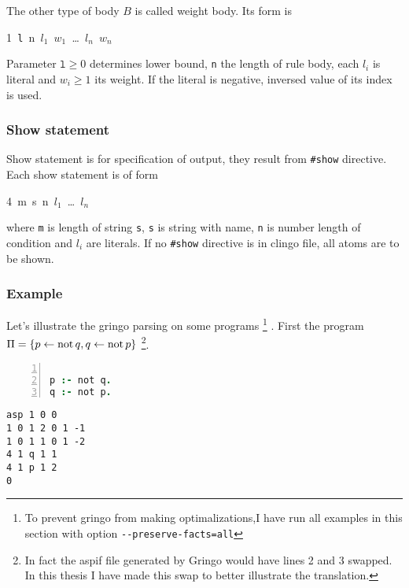 \documentclass{fithesis}
\begin{document}
The other type of body $B$ is called weight body. Its form is
{%
\newcommand{\ms}{\texttt{ }}
\begin{center}
    1\ms{}\texttt{l}\ms{}n\ms{}$l_1$\ms{}$w_1$\ms{}\dots\ms$l_n$\ms$w_n$
\end{center}
}\noindent
Parameter $\texttt{l}\geq 0$ determines lower bound, \texttt{n}
the length of rule body, each $l_i$ is literal and $w_i\geq 1$ its weight.
If the literal is negative, inversed value of its index is used.

\subsubsection{Show statement}

Show statement is for specification of output, they result from \texttt{\#show}
directive. Each show statement is of form
{%
\newcommand{\ms}{\texttt{ }}
\begin{center}
    4\ms{}m\ms{}s\ms{}n\ms{}$l_1$\ms{}\dots\ms$l_n$
\end{center}
}\noindent
where \texttt{m} is length of string \texttt{s}, \texttt{s} is string
with name, \texttt{n} is number length of condition and $l_i$ are literals.
If no \texttt{\#show} directive is in clingo file, all atoms are to be shown.

\subsubsection{Example}

Let's illustrate the gringo parsing on some programs%
\footnote{To prevent gringo from making optimalizations,I have run all examples
in this section with option \texttt{{-}{-}preserve-facts=all}}%
. First the program 
$\Pi = \{p \leftarrow{} \mathrm{not}\, q, q \leftarrow{} \mathrm{not}\, p\}$%
\footnote{In fact the aspif file generated by Gringo would have lines 2 and 3
swapped. In this thesis I have made this swap to better illustrate
the translation.}.

\begin{minipage}[t]{0.45\linewidth}
\centering
\begin{lstlisting}[language=prolog, numbers=left, countblanklines=false]

p :- not q.
q :- not p.
\end{lstlisting}
\end{minipage}
\hspace{1em}
\begin{minipage}[t]{0.45\linewidth}
\centering
\begin{lstlisting}[numbers=right, countblanklines=false]
asp 1 0 0
1 0 1 2 0 1 -1
1 0 1 1 0 1 -2
4 1 q 1 1
4 1 p 1 2
0
\end{lstlisting}
\end{minipage}
\end{document}

